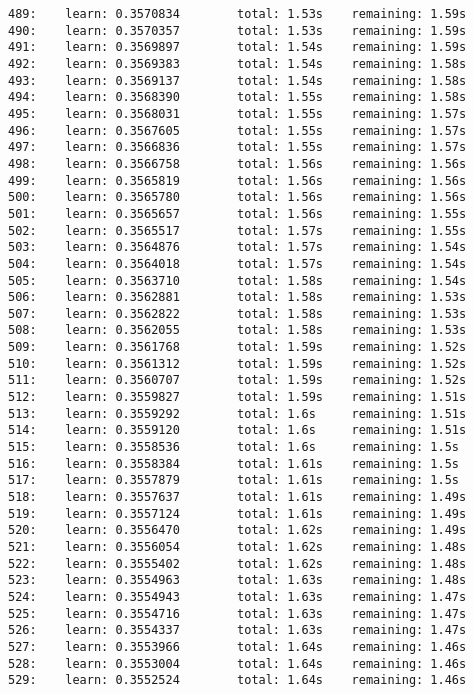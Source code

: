 \documentclass[11pt]{article}
\begin{document}
\begin{Verbatim}[commandchars=\\\{\}]
489:    learn: 0.3570834        total: 1.53s    remaining: 1.59s
490:    learn: 0.3570357        total: 1.53s    remaining: 1.59s
491:    learn: 0.3569897        total: 1.54s    remaining: 1.59s
492:    learn: 0.3569383        total: 1.54s    remaining: 1.58s
493:    learn: 0.3569137        total: 1.54s    remaining: 1.58s
494:    learn: 0.3568390        total: 1.55s    remaining: 1.58s
495:    learn: 0.3568031        total: 1.55s    remaining: 1.57s
496:    learn: 0.3567605        total: 1.55s    remaining: 1.57s
497:    learn: 0.3566836        total: 1.55s    remaining: 1.57s
498:    learn: 0.3566758        total: 1.56s    remaining: 1.56s
499:    learn: 0.3565819        total: 1.56s    remaining: 1.56s
500:    learn: 0.3565780        total: 1.56s    remaining: 1.56s
501:    learn: 0.3565657        total: 1.56s    remaining: 1.55s
502:    learn: 0.3565517        total: 1.57s    remaining: 1.55s
503:    learn: 0.3564876        total: 1.57s    remaining: 1.54s
504:    learn: 0.3564018        total: 1.57s    remaining: 1.54s
505:    learn: 0.3563710        total: 1.58s    remaining: 1.54s
506:    learn: 0.3562881        total: 1.58s    remaining: 1.53s
507:    learn: 0.3562822        total: 1.58s    remaining: 1.53s
508:    learn: 0.3562055        total: 1.58s    remaining: 1.53s
509:    learn: 0.3561768        total: 1.59s    remaining: 1.52s
510:    learn: 0.3561312        total: 1.59s    remaining: 1.52s
511:    learn: 0.3560707        total: 1.59s    remaining: 1.52s
512:    learn: 0.3559827        total: 1.59s    remaining: 1.51s
513:    learn: 0.3559292        total: 1.6s     remaining: 1.51s
514:    learn: 0.3559120        total: 1.6s     remaining: 1.51s
515:    learn: 0.3558536        total: 1.6s     remaining: 1.5s
516:    learn: 0.3558384        total: 1.61s    remaining: 1.5s
517:    learn: 0.3557879        total: 1.61s    remaining: 1.5s
518:    learn: 0.3557637        total: 1.61s    remaining: 1.49s
519:    learn: 0.3557124        total: 1.61s    remaining: 1.49s
520:    learn: 0.3556470        total: 1.62s    remaining: 1.49s
521:    learn: 0.3556054        total: 1.62s    remaining: 1.48s
522:    learn: 0.3555402        total: 1.62s    remaining: 1.48s
523:    learn: 0.3554963        total: 1.63s    remaining: 1.48s
524:    learn: 0.3554943        total: 1.63s    remaining: 1.47s
525:    learn: 0.3554716        total: 1.63s    remaining: 1.47s
526:    learn: 0.3554337        total: 1.63s    remaining: 1.47s
527:    learn: 0.3553966        total: 1.64s    remaining: 1.46s
528:    learn: 0.3553004        total: 1.64s    remaining: 1.46s
529:    learn: 0.3552524        total: 1.64s    remaining: 1.46s

\end{Verbatim}
\end{document}
